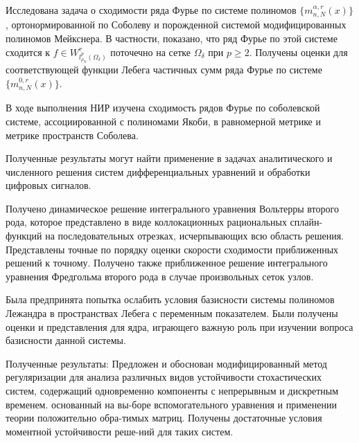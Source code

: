 Исследована задача о сходимости ряда Фурье по системе полиномов $\{m_{n,N}^{\alpha,r}(x)\}$, ортонормированной по Соболеву и порожденной системой модифицированных полиномов Мейкснера. В частности, показано, что ряд Фурье по этой системе сходится к $f\in W^r_{l^p_{\rho_N}(\Omega_\delta)}$ поточечно на сетке $\Omega_\delta$ при $p\ge2$. Получены оценки для соответствующей функции Лебега частичных сумм ряда Фурье по системе $\{m_{n,N}^{0,r}(x)\}$.


В ходе выполнения НИР изучена сходимость рядов Фурье по соболевской системе, ассоциированной с полиномами Якоби, в равномерной метрике и метрике пространств Соболева.

Полученные результаты могут найти применение в задачах аналитического и численного решения систем дифференциальных уравнений и обработки цифровых сигналов.



Получено динамическое решение интегрального уравнения Вольтерры второго рода,
которое представлено в виде коллокационных рациональных сплайн-функций
на последовательных отрезках, исчерпывающих всю область решения. Представлены
точные по порядку оценки скорости сходимости приближенных решений
к точному. Получено также приближенное решение интегрального уравнения Фредгольма
второго рода в случае произвольных сеток узлов.


Была предпринята попытка ослабить условия базисности системы полиномов Лежандра в пространствах Лебега с переменным показателем. Были получены оценки и представления для ядра, играющего важную роль при изучении вопроса базисности данной системы.

Полученные результаты:
Предложен и обоснован модифицированный метод регуляризации для анализа различных видов устойчивости стохастических систем, содержащий одновременно компоненты с непрерывным и дискретным временем. основанный на вы-боре вспомогательного уравнения и применении теории положительно обра-тимых матриц. Получены достаточные условия моментной устойчивости реше-ний для таких систем.




